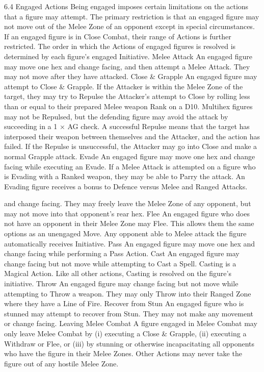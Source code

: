\documentclass[a4paper]{article}
\begin{document}
\begin{multicols}{3}
6.4 Engaged Actions
Being engaged imposes certain limitations on the
actions that a figure may attempt. The primary
restriction is that an engaged figure may not move
out of the Melee Zone of an opponent except in
special circumstances. If an engaged figure is in
Close Combat, their range of Actions is further
restricted.
The order in which the Actions of engaged figures
is resolved is determined by each figure’s engaged
Initiative.
Melee Attack
An engaged figure may move one hex and change
facing, and then attempt a Melee Attack. They may
not move after they have attacked.
Close \& Grapple
An engaged figure may attempt to Close & Grapple. If the Attacker is within the Melee Zone of the
target, they may try to Repulse the Attacker’s
attempt to Close by rolling less than or equal to
their prepared Melee weapon Rank on a D10.
Multihex figures may not be Repulsed, but the
defending figure may avoid the attack by succeeding in a 1 × AG check.
A successful Repulse means that the target has
interposed their weapon between themselves and
the Attacker, and the action has failed. If the Repulse is unsuccessful, the Attacker may go into
Close and make a normal Grapple attack.
Evade
An engaged figure may move one hex and change
facing while executing an Evade. If a Melee Attack
is attempted on a figure who is Evading with a
Ranked weapon, they may be able to Parry the
attack. An Evading figure receives a bonus to
Defence versus Melee and Ranged Attacks.

and change facing. They may freely leave the
Melee Zone of any opponent, but may not move
into that opponent’s rear hex.
Flee
An engaged figure who does not have an opponent
in their Melee Zone may Flee. This allows them
the same options as
an unengaged Move. Any opponent able to Melee
attack the figure automatically receives Initiative.
Pass
An engaged figure may move one hex and change
facing while performing a Pass Action.
Cast
An engaged figure may change facing but not
move while attempting to Cast a Spell. Casting is a
Magical Action. Like all other actions, Casting is
resolved on the figure’s initiative.
Throw
An engaged figure may change facing but not
move while attempting to Throw a weapon. They
may only Throw into their Ranged Zone where
they have a Line of Fire.
Recover from Stun
An engaged figure who is stunned may attempt to
recover from Stun. They may not make any
movement or change facing.
Leaving Melee Combat
A figure engaged in Melee Combat may only leave
Melee Combat by (i) executing a Close & Grapple,
(ii) executing a Withdraw or Flee, or (iii) by stunning or otherwise incapacitating all opponents who
have the figure in their Melee Zones. Other Actions may never take the figure out of any hostile
Melee Zone.


\end{multicols}
\end{document}
